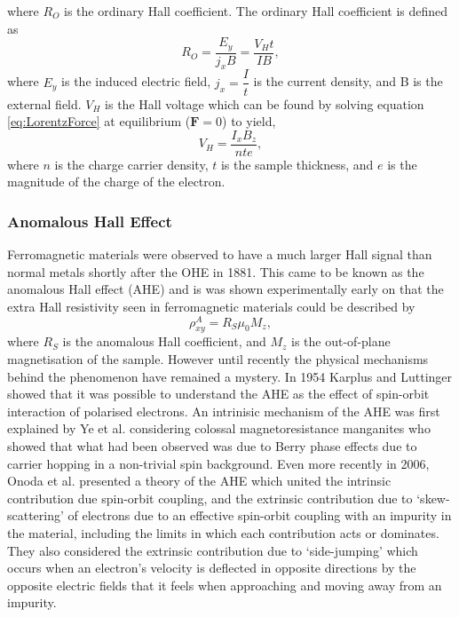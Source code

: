         where $R_{O}$ is the ordinary Hall coefficient. The ordinary Hall coefficient is defined as
        \begin{equation}\label{eq:OHcoeff}
	        R_{O}=\dfrac{E_{y}}{j_{x}B}=\dfrac{V_{H}t}{IB},
        \end{equation}
        where $E_{y}$ is the induced electric field, $j_{x}=\dfrac{I}{t}$ is the current density, and B is the external field. $V_{H}$ is the Hall voltage which can be found by solving equation \ref{eq:LorentzForce} at equilibrium ($\textbf{F}=0$) to yield, 
        \begin{equation}\label{eq:hallvoltage}
	        V_{H}=\dfrac{I_{x}B_{z}}{nte},
        \end{equation}
        where $n$ is the charge carrier density, $t$ is the sample thickness, and $e$ is the magnitude of the charge of the electron.

        \subsubsection{Anomalous Hall Effect}\label{subsubsec:AHE}
        Ferromagnetic materials were observed to have a much larger Hall signal than normal metals shortly after the OHE in 1881\cite{Hall1881}. This came to be known as the anomalous Hall effect (AHE) and is was shown experimentally early on that the extra Hall resistivity seen in ferromagnetic materials could be described by
        \begin{equation}\label{eq:AHE}
    	    \rho_{xy}^{A} = R_{S}\mu_{0}M_{z},
        \end{equation}
        where $R_{S}$ is the anomalous Hall coefficient, and $M_{z}$ is the out-of-plane magnetisation of the sample\cite{Pugh1953}. However until recently the physical mechanisms behind the phenomenon have remained a mystery. In 1954 Karplus and Luttinger showed that it was possible to understand the AHE as the effect of spin-orbit interaction of polarised electrons\cite{Karplus1954}. An intrinisic mechanism of the AHE was first explained by Ye et al. considering colossal magnetoresistance manganites who showed that what had been observed was due to Berry phase effects due to carrier hopping in a non-trivial spin background\cite{Ye1999}. Even more recently in 2006, Onoda et al. presented a theory of the AHE which united the intrinsic contribution due spin-orbit coupling, and the extrinsic contribution due to `skew-scattering' of electrons due to an effective spin-orbit coupling with an impurity in the material, including the limits in which each contribution acts or dominates\cite{Onoda2006}. They also considered the extrinsic contribution due to `side-jumping' which occurs  when an electron's velocity is deflected in opposite directions by the opposite electric fields that it feels when approaching and moving away from an impurity\cite{Nagaosa2010}.

